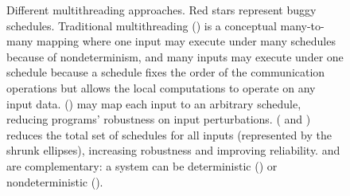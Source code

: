 \begin{figure}[t]
\begin{center}
\vspace{-.05in}
\caption{Different multithreading approaches. Red stars represent buggy
schedules.  Traditional multithreading () is a conceptual
many-to-many mapping where one input may execute under many schedules because of
nondeterminism, and many inputs may execute under one schedule because a
schedule fixes the order of the communication operations but allows the local
computations to operate on any input data.  \dmt () may map
each input to an arbitrary schedule, reducing programs' robustness on input
perturbations.  \smt ( and ) reduces the
total set of schedules for all inputs (represented by the shrunk ellipses),
increasing robustness and improving reliability. \smt and \dmt are
complementary: a \smt system can be deterministic () or
nondeterministic ().}
\vspace{-.2in}
\end{center}
\end{figure}

